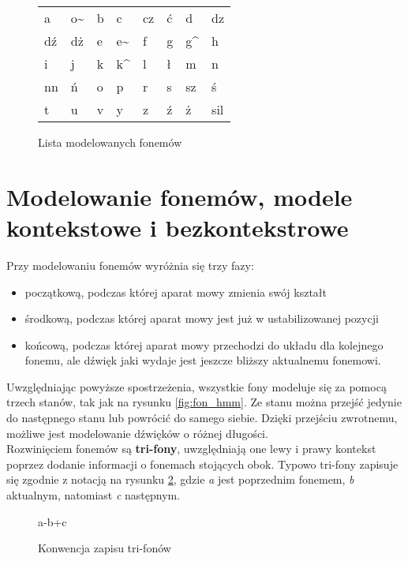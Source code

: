 \documentclass[shortabstract, mgr]{iithesis}
\begin{document}
		\begin{figure}
			\centering
			\begin{tabular}{|K{1cm}K{1cm}K{1cm}K{1cm}K{1cm}K{1cm}K{1cm}K{1cm}|}
				\hline
				a  & o\~ & b & c & cz & ć & d & dz \\ 
				dź & dż & e & e\~ & f & g & g\^ & h \\
				i & j & k & k\^ & l & ł & m & n \\
				nn & ń & o & p  & r & s & sz & ś \\
				t & u & v & y & z & ź & ż & sil \\
				\hline
			\end{tabular}
			\caption{\label{tab:phone_list}Lista modelowanych fonemów}
		\end{figure}
 

	\section{ Modelowanie fonemów, modele kontekstowe i bezkontekstrowe }
		\label{sec:trifones_definition}
		
		Przy modelowaniu fonemów wyróżnia się trzy fazy:
		\begin{itemize}
			\item początkową, podczas której aparat mowy zmienia swój kształt
			\item środkową, podczas której aparat mowy jest już w ustabilizowanej pozycji
			\item końcową, podczas której aparat mowy przechodzi do układu dla kolejnego fonemu, ale dźwięk jaki wydaje jest jeszcze bliższy aktualnemu fonemowi. 
		\end{itemize}
		Uwzględniając powyższe spostrzeżenia, wszystkie fony modeluje się za pomocą trzech stanów, tak jak na rysunku \ref{fig:fon_hmm}. Ze stanu można przejść jedynie do następnego stanu lub powrócić do samego siebie. Dzięki przejściu zwrotnemu, możliwe jest modelowanie dźwięków o różnej długości. 
		\\
		Rozwinięciem fonemów są \textbf{tri-fony}, uwzględniają one lewy i prawy kontekst poprzez dodanie informacji o fonemach stojących obok. Typowo tri-fony zapisuje się zgodnie z notacją na rysunku \ref{fig:tri-fony_notacja}, gdzie \textit{a} jest poprzednim fonemem, \textit{b} aktualnym, natomiast \textit{c} następnym. 
		
		\begin{figure}[H]
			\begin{center}
			{a-b+c}
			\end{center}
			\caption{Konwencja zapisu tri-fonów}
			\label{fig:tri-fony_notacja}
		\end{figure}
	
\end{document}
